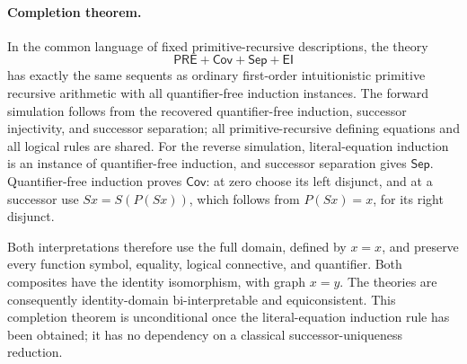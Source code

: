 \paragraph{Completion theorem.}
In the common language of fixed primitive-recursive descriptions, the
theory
\[
 \mathsf{PRE}+\mathsf{Cov}+\mathsf{Sep}+\mathsf{EI}
\]
has exactly the same sequents as ordinary first-order intuitionistic
primitive recursive arithmetic with all quantifier-free induction
instances.  The forward simulation follows from the recovered
quantifier-free induction, successor injectivity, and successor separation;
all primitive-recursive defining equations and all logical rules are
shared.  For the reverse simulation, literal-equation induction is an
instance of quantifier-free induction, and successor separation gives
$\mathsf{Sep}$.  Quantifier-free induction proves $\mathsf{Cov}$:
at zero choose its left disjunct, and at a successor use
$Sx=S(P(Sx))$, which follows from $P(Sx)=x$, for its right disjunct.

Both interpretations therefore use the full domain, defined by $x=x$,
and preserve every function symbol, equality, logical connective, and
quantifier.  Both composites have the identity isomorphism, with graph
$x=y$.  The theories are consequently identity-domain bi-interpretable
and equiconsistent.  This completion theorem is unconditional once the
literal-equation induction rule has been obtained; it has no dependency
on a classical successor-uniqueness reduction.



